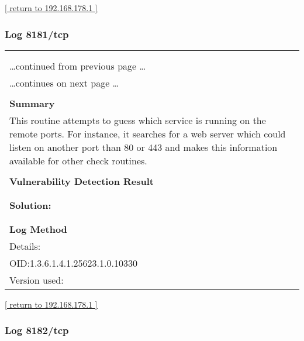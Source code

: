 \documentclass{article}
\begin{document}
\begin{footnotesize}\hyperref[host:192.168.178.1]{[ return to 192.168.178.1 ]}\end{footnotesize}
\subsubsection{Log 8181/tcp}
\label{port:192.168.178.1 8181/tcp Log}

\begin{longtable}{|p{}|}
\hline
\rowcolor{gvm_log}{\color{white}{Log (CVSS: 0.0) }}\\
\rowcolor{gvm_log}{\color{white}{NVT: Services}}\\
\hline
\endfirsthead
\hfill\ldots continued from previous page \ldots \\
\hline
\endhead
\hline
\ldots continues on next page \ldots \\
\endfoot
\hline
\endlastfoot
\\
\textbf{Summary}\\
This routine attempts to guess which service is running on the
  remote ports. For instance, it searches for a web server which could listen on another port than
  80 or 443 and makes this information available for other check routines.\\

        \hline
        \\
\textbf{Vulnerability Detection Result}\\
\rowcolor{white}{\verb=A web server is running on this port=}\\

          \hline
          \\
\textbf{Solution:}\\
\\


        \hline
        \\
\textbf{Log Method}\\
Details:
\rowcolor{white}{\verb=Services=}\\
OID:1.3.6.1.4.1.25623.1.0.10330\\
Version used:
\rowcolor{white}{\verb=2021-03-15T10:42:03Z=}\\
\end{longtable}

\begin{footnotesize}\hyperref[host:192.168.178.1]{[ return to 192.168.178.1 ]}\end{footnotesize}
\subsubsection{Log 8182/tcp}
\label{port:192.168.178.1 8182/tcp Log}
\end{document}
